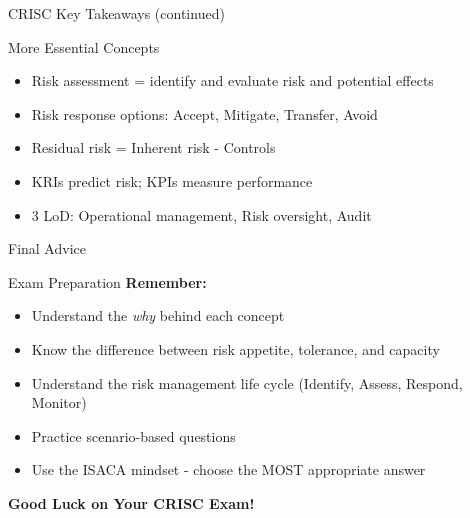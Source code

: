 \documentclass{beamer}
\begin{document}
	\begin{frame}{CRISC Key Takeaways (continued)}
		\begin{block}{More Essential Concepts}
			\begin{itemize}
				\item Risk assessment = identify and evaluate risk and potential effects
				\item Risk response options: Accept, Mitigate, Transfer, Avoid
				\item Residual risk = Inherent risk - Controls
				\item KRIs predict risk; KPIs measure performance
				\item 3 LoD: Operational management, Risk oversight, Audit
			\end{itemize}
		\end{block}
	\end{frame}
	
	\begin{frame}{Final Advice}
		\begin{block}{Exam Preparation}
			\centering
			\vspace{0.3cm}
			\textbf{Remember:}
			\begin{itemize}
				\item Understand the \textit{why} behind each concept
				\item Know the difference between risk appetite, tolerance, and capacity
				\item Understand the risk management life cycle (Identify, Assess, Respond, Monitor)
				\item Practice scenario-based questions
				\item Use the ISACA mindset - choose the MOST appropriate answer
			\end{itemize}
			\vspace{0.5cm}
			\textbf{Good Luck on Your CRISC Exam!}
		\end{block}
	\end{frame}
	
\end{document}

